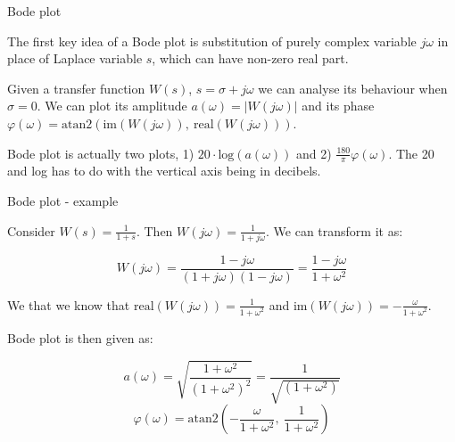 \documentclass{beamer}
\begin{document}
\begin{frame}{Bode plot}
\begin{flushleft}

The first key idea of a Bode plot is substitution of purely complex variable $j \omega$ in place of Laplace variable $s$, which can have non-zero real part.

\bigskip

Given a transfer function $W(s)$, $s = \sigma + j \omega$ we can analyse its behaviour when $\sigma = 0$. We can plot its amplitude $a(\omega) = \left| W(j \omega) \right|$ and its phase $\varphi(\omega) = \text{atan2}( \text{im}(W(j \omega)), \ \text{real}(W(j \omega))  )$.

\bigskip
 
Bode plot is actually two plots, 1) $20 \cdot \text{log}(a(\omega))$ and 2) $\frac{180}{\pi} \varphi(\omega)$. The 20 and log has to do with the vertical axis being in decibels. 

\end{flushleft}
\end{frame}




\begin{frame}{Bode plot - example}
\begin{flushleft}

Consider $W(s) = \frac{1}{1 + s}$. Then $W(j \omega) = \frac{1}{1 + j \omega}$. We can transform it as:

\begin{equation}
    W(j \omega) = \frac{1 - j \omega}{(1 + j \omega)(1 - j \omega)} = 
    \frac{1 - j \omega}{1 + \omega^2}
\end{equation}

We that we know that $\text{real}(W(j \omega)) = \frac{1}{1 + \omega^2}$ and $\text{im}(W(j \omega)) = - \frac{\omega}{1 + \omega^2}$.

\bigskip
 
Bode plot is then given as:

\begin{equation}
   a(\omega) = \sqrt{\frac{1 + \omega^2}{(1 + \omega^2)^2}} = 
   \frac{1}{\sqrt{(1 + \omega^2)}}
\end{equation}
\begin{equation}
   \varphi(\omega) = \text{atan2} \left(-\frac{\omega}{1 + \omega^2}, \ \frac{1}{1 + \omega^2} \right)
\end{equation}

\end{flushleft}
\end{frame}
\end{document}
